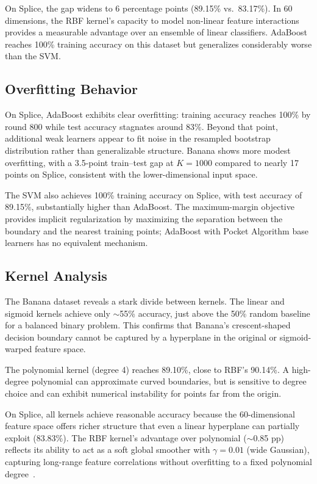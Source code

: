 \documentclass{acm_proc_article-sp}
\begin{document}
On Splice, the gap widens to 6 percentage points (89.15\% vs.\ 83.17\%). In 60 dimensions, the RBF kernel's capacity to model non-linear feature interactions provides a measurable advantage over an ensemble of linear classifiers. AdaBoost reaches 100\% training accuracy on this dataset but generalizes considerably worse than the SVM.

\subsection{Overfitting Behavior}

On Splice, AdaBoost exhibits clear overfitting: training accuracy reaches 100\% by round 800 while test accuracy stagnates around 83\%. Beyond that point, additional weak learners appear to fit noise in the resampled bootstrap distribution rather than generalizable structure. Banana shows more modest overfitting, with a 3.5-point train--test gap at $K=1000$ compared to nearly 17 points on Splice, consistent with the lower-dimensional input space.

The SVM also achieves 100\% training accuracy on Splice, with test accuracy of 89.15\%, substantially higher than AdaBoost. The maximum-margin objective provides implicit regularization by maximizing the separation between the boundary and the nearest training points; AdaBoost with Pocket Algorithm base learners has no equivalent mechanism.

\subsection{Kernel Analysis}

The Banana dataset reveals a stark divide between kernels. The linear and sigmoid kernels achieve only $\sim$55\% accuracy, just above the 50\% random baseline for a balanced binary problem. This confirms that Banana's crescent-shaped decision boundary cannot be captured by a hyperplane in the original or sigmoid-warped feature space.

The polynomial kernel (degree 4) reaches 89.10\%, close to RBF's 90.14\%. A high-degree polynomial can approximate curved boundaries, but is sensitive to degree choice and can exhibit numerical instability for points far from the origin.

On Splice, all kernels achieve reasonable accuracy because the 60-dimensional feature space offers richer structure that even a linear hyperplane can partially exploit (83.83\%). The RBF kernel's advantage over polynomial ($\sim$0.85 pp) reflects its ability to act as a soft global smoother with $\gamma=0.01$ (wide Gaussian), capturing long-range feature correlations without overfitting to a fixed polynomial degree~\cite{scholkopf2002}.
\end{document}
